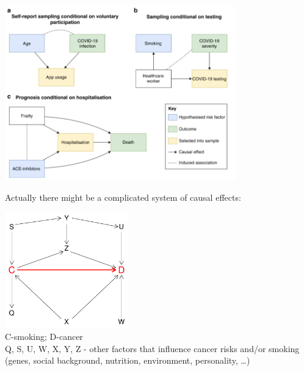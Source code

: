 \documentclass[10pt,dvipsnames,t,handout%
,aspectratio=169%
]{beamer}%
\begin{document}
\begin{frame}
	
	\includegraphics[width=10cm]{select_covid}
	
\end{frame}




\begin{frame}
 Actually there might be a complicated system of
causal effects:

{\includegraphics[width=0.4\textwidth]{keeruline2}}\\
{\small  C-smoking; D-cancer \\
Q, S, U, W, X, Y, Z - other factors that influence cancer risks
and/or smoking (genes, social background, nutrition, environment,
personality, \ldots)}
\end{frame}
\end{document}
